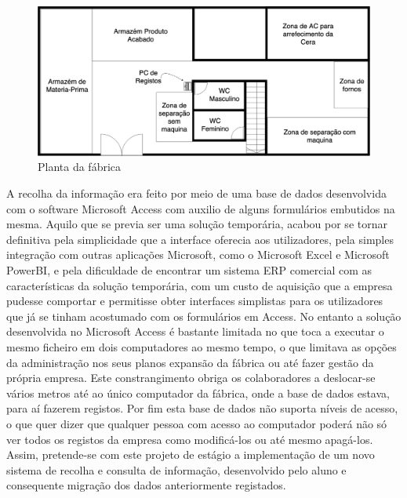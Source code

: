 \begin{figure}[H] 
	\begin{center}
		\includegraphics[width=\textwidth,keepaspectratio]{figuras/PlantaNaturalLife.png}
		\caption{Planta da fábrica}\label{fig:planta_naturallife} 
	\end{center}
\end{figure}

A recolha da informação era feito por meio de uma base de dados desenvolvida com o software Microsoft Access\label{sym:MS_ACCESS} com auxilio de alguns formulários embutidos na mesma. Aquilo que se previa ser uma solução temporária, acabou por se tornar definitiva pela simplicidade que a interface oferecia aos utilizadores, pela simples integração com outras aplicações Microsoft, como o Microsoft Excel\label{sym:MS_EXCEL} e Microsoft PowerBI\label{sym:MS_POWERBI}, e pela dificuldade de encontrar um sistema ERP\label{sym:ERP} comercial com as características da solução temporária, com um custo de aquisição que a empresa pudesse comportar e permitisse obter interfaces simplistas para os utilizadores que já se tinham acostumado com os formulários em Access.
No entanto a solução desenvolvida no Microsoft Access é bastante limitada no que toca a executar o mesmo ficheiro em dois computadores ao mesmo tempo, o que limitava as opções da administração nos seus planos expansão da fábrica ou até fazer gestão da própria empresa. Este constrangimento obriga os colaboradores a deslocar-se vários metros até ao único computador da fábrica, onde a base de dados estava, para aí fazerem registos. Por fim esta base de dados não suporta níveis de acesso, o que quer dizer que qualquer pessoa com acesso ao computador poderá não só ver todos os registos da empresa como modificá-los ou até mesmo apagá-los.\\
Assim, pretende-se com este projeto de estágio a implementação de um novo sistema de recolha e consulta de informação, desenvolvido pelo aluno e consequente migração dos dados anteriormente registados.
\newpage



